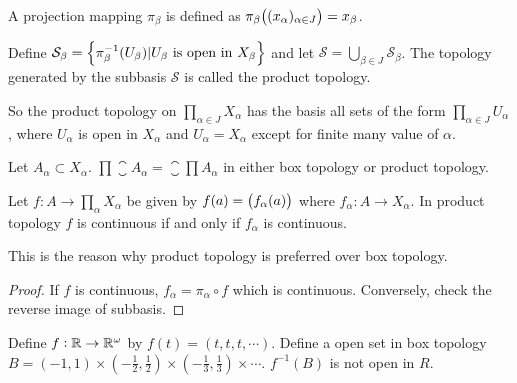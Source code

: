 \begin{definition}
    A projection mapping $\pi_\beta$ is defined as $\pi_\beta \mleft( (x_{\alpha})_{\alpha \in J} \mright) = x_\beta$.
\end{definition}

\begin{definition}
    Define $\mathcal{S}_{\beta} = \set{\pi_{\beta}^{-1}(U_{\beta}) | U_{\beta}\text{ is open in }X_{\beta}}$ and let $\mathcal{S} = \displaystyle \bigcup_{\beta \in J} \mathcal{S}_{\beta}$. The topology generated by the subbasis $\mathcal{S}$ is called the product topology. 
    
    So the product topology on $\displaystyle \prod_{\alpha \in J} X_{\alpha}$ has the basis all sets of the form $\displaystyle \prod_{\alpha \in J} U_{\alpha}$, where $U_{\alpha}$ is open in $X_{\alpha}$ and $U_{\alpha} = X_{\alpha}$ except for finite many value of $\alpha$.
\end{definition}

\begin{theorem}
Let $A_{\alpha} \subset X_{\alpha}$. $\displaystyle \prod \closure{A_{\alpha}} = \closure{\prod A_{\alpha}}$ in either box topology or product topology.
\end{theorem}


\begin{theorem}
Let $\displaystyle f : A \rightarrow \prod_{\alpha} X_{\alpha}$ be given by $f(a) = \mleft( f_{\alpha}(a) \mright)$ where $f_{\alpha} : A \rightarrow X_{\alpha}$. In product topology $f$ is continuous if and only if $f_{\alpha}$ is continuous.

This is the reason why product topology is preferred over box topology.
\end{theorem}
\begin{proof}
    If $f$ is continuous, $f_\alpha = \pi_\alpha \circ f$ which is continuous. Conversely, check the reverse image of subbasis.
\end{proof}

\begin{example}
    Define $f: \mathbb{R} \rightarrow \mathbb{R}^{\omega}$ by $f(t) = (t,t,t, \cdots)$. Define a open set in box topology $B = (-1, 1) \times (- \frac{1}{2}, \frac{1}{2}) \times  (- \frac{1}{3}, \frac{1}{3}) \times \cdots$. $f^{-1}(B)$ is not open in $R$.
\end{example}



